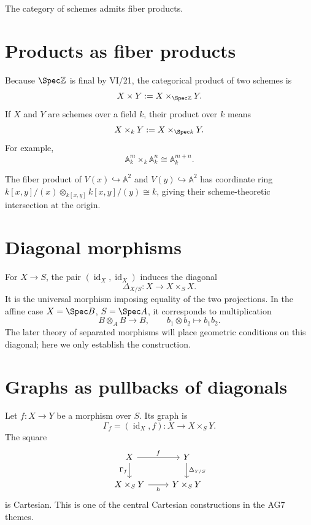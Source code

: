 \begin{theorem}\label{thm:vi23-existence}
The category of schemes admits fiber products.
\end{theorem}



\section{Products as fiber products}
Because $\Spec\mathbb Z$ is final by VI/21, the categorical product of two schemes is
\[
X\times Y:=X\times_{\Spec\mathbb Z}Y.
\]
If $X$ and $Y$ are schemes over a field $k$, their product over $k$ means
\[
X\times_kY:=X\times_{\Spec k}Y.
\]
For example,
\[
\mathbb A^m_k\times_k\mathbb A^n_k\cong\mathbb A^{m+n}_k.
\]



\begin{example}\label{ex:vi23-expand-02}
The fiber product of $V(x)\hookrightarrow\mathbb A^2$ and $V(y)\hookrightarrow\mathbb A^2$ has coordinate ring $k[x,y]/(x)\otimes_{k[x,y]}k[x,y]/(y)\cong k$, giving their scheme-theoretic intersection at the origin.
\end{example}
\section{Diagonal morphisms}
For $X\to S$, the pair $(\operatorname{id}_X,\operatorname{id}_X)$ induces the diagonal
\[
\Delta_{X/S}:X\longrightarrow X\times_SX.
\]
It is the universal morphism imposing equality of the two projections.  In the affine case
$X=\Spec B$, $S=\Spec A$, it corresponds to multiplication
\[
B\otimes_A B\longrightarrow B,\qquad b_1\otimes b_2\longmapsto b_1b_2.
\]
The later theory of separated morphisms will place geometric conditions on this diagonal; here we
only establish the construction.



\section{Graphs as pullbacks of diagonals}
Let $f:X\to Y$ be a morphism over $S$.  Its graph is
\[
\Gamma_f=(\operatorname{id}_X,f):X\to X\times_SY.
\]
The square
\[
\begin{tikzcd}
X \arrow[r,"f"] \arrow[d,"\Gamma_f"'] & Y \arrow[d,"\Delta_{Y/S}"]\\
X\times_SY \arrow[r,"h"'] & Y\times_SY
\end{tikzcd}
\]
is Cartesian.  This is one of the central Cartesian constructions in the AG7 themes.

